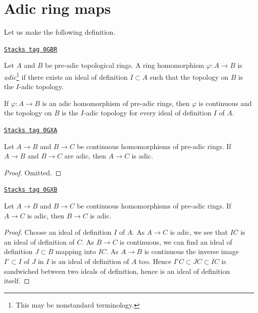 \section{Adic ring maps}
\label{formal-spaces-section-adic-ring-maps}
Let us make the following definition.

\begin{definition}
\label{formal-spaces-definition-adic-homomorphism}
\href{https://stacks.math.columbia.edu/tag/0GBR}{\texttt{Stacks tag 0GBR}}

Let $A$ and $B$ be pre-adic topological rings. A ring homomorphism
$\varphi : A \to B$ is {\it adic}\footnote{This may be nonstandard terminology.}
if there exists an ideal of definition $I \subset A$ such that
the topology on $B$ is the $I$-adic topology.
\end{definition}

If $\varphi : A \to B$ is an adic homomorphism of pre-adic rings, then
$\varphi$ is continuous and the topology on $B$ is the $I$-adic topology
for every ideal of definition $I$ of $A$.

\begin{lemma}
\label{formal-spaces-lemma-composition-adic}
\href{https://stacks.math.columbia.edu/tag/0GXA}{\texttt{Stacks tag 0GXA}}

Let $A \to B$ and $B \to C$ be continuous homomorphisms of
pre-adic rings. If $A \to B$ and $B \to C$ are adic, then
$A \to C$ is adic.
\end{lemma}

\begin{proof}
Omitted.
\end{proof}

\begin{lemma}
\label{formal-spaces-lemma-permanence-adic}
\href{https://stacks.math.columbia.edu/tag/0GXB}{\texttt{Stacks tag 0GXB}}

Let $A \to B$ and $B \to C$ be continuous homomorphisms of
pre-adic rings. If $A \to C$ is adic, then
$B \to C$ is adic.
\end{lemma}

\begin{proof}
Choose an ideal of definition $I$ of $A$. As $A \to C$ is adic, we
see that $IC$ is an ideal of definition of $C$.
As $B \to C$ is continuous, we can find an
ideal of definition $J \subset B$ mapping into $IC$.
As $A \to B$ is continuous the inverse image $I' \subset I$
of $J$ in $I$ is an ideal of definition of $A$ too.
Hence $I'C \subset JC \subset IC$ is sandwiched between
two ideals of definition, hence is an ideal of definition itself.
\end{proof}

